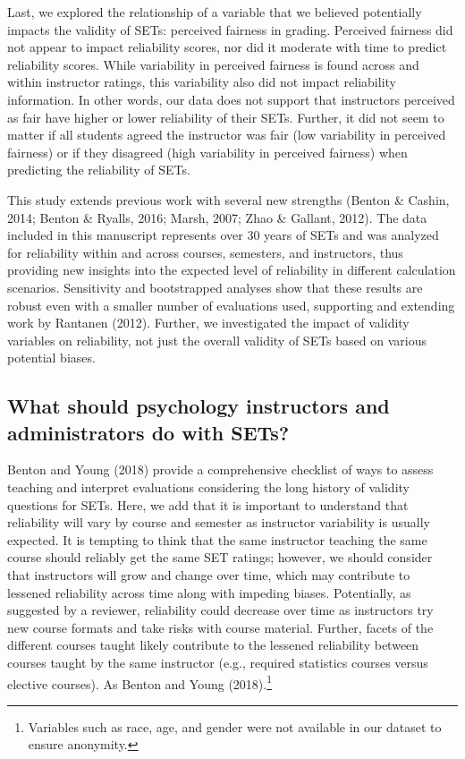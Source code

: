 \documentclass[
  man]{apa7}
\begin{document}
Last, we explored the relationship of a variable that we believed
potentially impacts the validity of SETs: perceived fairness in grading.
Perceived fairness did not appear to impact reliability scores, nor did
it moderate with time to predict reliability scores. While variability
in perceived fairness is found across and within instructor ratings,
this variability also did not impact reliability information. In other
words, our data does not support that instructors perceived as fair have
higher or lower reliability of their SETs. Further, it did not seem to
matter if all students agreed the instructor was fair (low variability
in perceived fairness) or if they disagreed (high variability in
perceived fairness) when predicting the reliability of SETs.

This study extends previous work with several new strengths (Benton \& Cashin, 2014; Benton \& Ryalls, 2016; Marsh, 2007; Zhao \& Gallant, 2012). The data included in this
manuscript represents over 30 years of SETs and was analyzed for
reliability within and across courses, semesters, and instructors, thus providing new insights into the expected level of reliability in
different calculation scenarios. Sensitivity and bootstrapped analyses
show that these results are robust even with a smaller number of
evaluations used, supporting and extending work by Rantanen (2012).
Further, we investigated the impact of validity variables on
reliability, not just the overall validity of SETs based on various
potential biases.

\hypertarget{what-should-psychology-instructors-and-administrators-do-with-sets}{%
\subsection{What should psychology instructors and administrators do with SETs?}\label{what-should-psychology-instructors-and-administrators-do-with-sets}}

Benton and Young (2018) provide a comprehensive checklist of ways to assess teaching and interpret evaluations considering the long history of validity questions for SETs. Here, we add that it is important to understand that reliability will vary by course and semester as instructor variability is usually expected. It is tempting to think that the same instructor teaching the same course should reliably get the same SET ratings; however, we should consider that instructors will grow and change over time, which may contribute to lessened reliability across time along with impeding biases. Potentially, as suggested by a reviewer, reliability could decrease over time as instructors try new course formats and take risks with course material. Further, facets of the different courses taught likely contribute to the lessened reliability between courses taught by the same instructor (e.g., required statistics courses versus elective courses). As Benton and Young (2018).\footnote{Variables such as race, age, and gender were not available in our
  dataset to ensure anonymity.}
\end{document}
